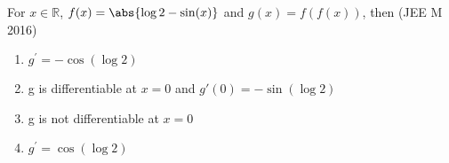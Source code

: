 

\iffalse
\title{11B(36-37)}
\author{EE24BTECH11055 - Sai Akhila Reddy Turpu}
\section{mains}
\fi
		


	\item For $x\in\mathbb{R}$, $f(x)=\abs{\log 2-\sin(x)}$ and 
	$g(x)=f(f(x))$, then 
	\hfill{(JEE M 2016)}
	\begin{enumerate}
		\item $g^{\prime} = -\cos(\log 2)$
		\item g is differentiable at $x=0$ and $g'(0) = -\sin(\log 2)$
		\item g is not differentiable at $x=0$
		\item $g^{\prime} =  \cos(\log 2)$
	\end{enumerate}

